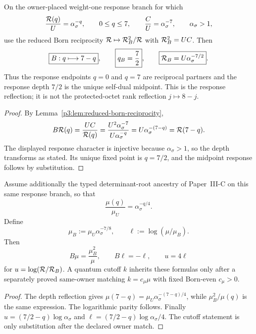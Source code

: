 \documentclass[12pt,a4paper]{article}
\begin{document}
\begin{theorem}
\label{p3d:thm:born-seven-depth-reflection}
On the owner-placed weight-one response branch for which
\[
 \frac{\mathcal R(q)}{U}=\alpha_\sigma^{-q},
 \qquad 0\le q\le7,
 \qquad
 \frac{C}{U}=\alpha_\sigma^{-7},
 \qquad \alpha_\sigma>1,
\]
use the reduced Born reciprocity
$\mathcal R\mapsto\mathcal R_B^2/\mathcal R$ with
$\mathcal R_B^2=UC$.  Then
\[
 \boxed{B:q\longmapsto7-q},
 \qquad
 \boxed{q_B=\frac72},
 \qquad
 \boxed{\mathcal R_B=U\alpha_\sigma^{-7/2}}.
\]
Thus the response endpoints $q=0$ and $q=7$ are reciprocal partners and the
response depth $7/2$ is the unique self-dual midpoint.  This is the response
reflection; it is not the protected-octet rank reflection $j\mapsto8-j$.
\end{theorem}

\begin{proof}
By Lemma~\ref{p3:lem:reduced-born-reciprocity},
\[
 B\mathcal R(q)=\frac{UC}{\mathcal R(q)}
 =\frac{U^2\alpha_\sigma^{-7}}{U\alpha_\sigma^{-q}}
 =U\alpha_\sigma^{-(7-q)}=\mathcal R(7-q).
\]
The displayed response character is injective because $\alpha_\sigma>1$, so
the depth transforms as stated.  Its unique fixed point is $q=7/2$, and the
midpoint response follows by substitution.
\end{proof}

\begin{corollary}
\label{p3d:cor:born-operational-scale-inversion}
Assume additionally the typed determinant-root ancestry of Paper~III-C on this
same response branch, so that
\[
 \frac{\mu(q)}{\mu_U}=\alpha_\sigma^{-q/4}.
\]
Define
\[
 \mu_B:=\mu_U\alpha_\sigma^{-7/8},
 \qquad
 \ell:=\log(\mu/\mu_B).
\]
Then
\[
 \boxed{B\mu=\frac{\mu_B^2}{\mu}},
 \qquad
 \boxed{B\ell=-\ell},
 \qquad
 \boxed{u=4\ell}
\]
for $u=\log(\mathcal R/\mathcal R_B)$.  A quantum cutoff $k$ inherits these formulas
only after a separately proved same-owner matching $k=c_\mu\mu$ with fixed
Born-even $c_\mu>0$.
\end{corollary}

\begin{proof}
The depth reflection gives
$\mu(7-q)=\mu_U\alpha_\sigma^{-(7-q)/4}$, while
$\mu_B^2/\mu(q)$ is the same expression.  The logarithmic parity follows.
Finally
$u=(7/2-q)\log\alpha_\sigma$ and
$\ell=(7/2-q)\log\alpha_\sigma/4$.
The cutoff statement is only substitution after the declared owner match.
\end{proof}
\end{document}
